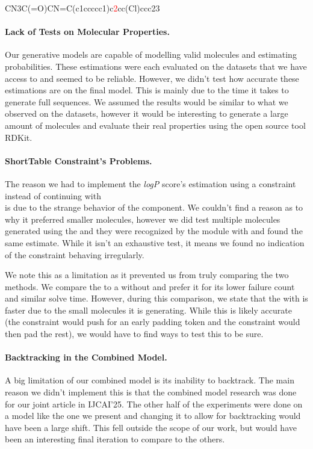 \documentclass[../Document.tex]{subfiles}
\begin{document}
{
    \centering
    CN3C(=O)CN=C(c1ccccc1)c\textcolor{red}{2}cc(Cl)ccc23
}


\paragraph{Lack of Tests on Molecular Properties.}
Our generative models are capable of modelling valid molecules and estimating probabilities.
These estimations were each evaluated on the datasets that we have access to and seemed to be reliable.
However, we didn't test how accurate these estimations are on the final model.
This is mainly due to the time it takes to generate full sequences.
We assumed the results would be similar to what we observed on the datasets, however it would be interesting to generate a large amount of molecules and evaluate their real properties using the open source tool RDKit.


\paragraph{ShortTable Constraint's \bp Problems.}
The reason we had to implement the \emph{logP} score's estimation using a \costregular constraint instead of continuing with\\ \shortTable is due to the strange behavior of the \bp component.
We couldn't find a reason as to why it preferred smaller molecules, however we did test multiple molecules generated using the \costregular and they were recognized by the module with \shortTable and found the same estimate.
While it isn't an exhaustive test, it means we found no indication of the constraint behaving irregularly.

We note this as a limitation as it prevented us from truly comparing the two methods.
We compare the \costregular to a \shortTable without \bp and prefer it for its lower failure count and similar solve time.
However, during this comparison, we state that the \shortTable with \bp is faster due to the small molecules it is generating.
While this is likely accurate (the \shortTable constraint would push for an early padding token and the \grammar constraint would then pad the rest), we would have to find ways to test this to be sure.


\paragraph{Backtracking in the Combined Model.}
A big limitation of our combined model is its inability to backtrack.
The main reason we didn't implement this is that the combined model research was done for our joint article in IJCAI'25\cite{ijcai:saikali}.
The other half of the experiments were done on a model like the one we present and changing it to allow for backtracking would have been a large shift.
This fell outside the scope of our work, but would have been an interesting final iteration to compare to the others.
\end{document}
